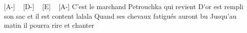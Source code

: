 [A-] ~ [D-] ~ [E] ~ [A-]
C'est le marchand Petrouchka qui revient
D'or est rempli son sac et il est content lalala
Quand ses chevaux fatigués auront bu
Jusqu'au matin il pourra rire et chanter